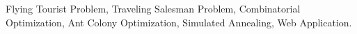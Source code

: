 \noindent 

Flying Tourist Problem, Traveling Salesman Problem, 
Combinatorial Optimization, Ant Colony Optimization, Simulated 
Annealing, Web Application.